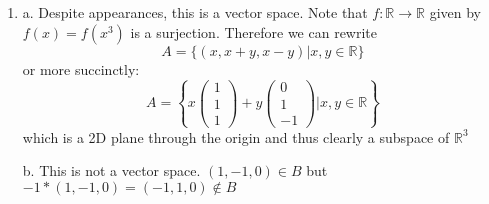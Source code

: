 \documentclass{article}
\newcommand{\chapternumber}{2}
\newenvironment{QandA}{\begin{enumerate}[label=\chapternumber.\arabic*]\bfseries\boldmath}
	{\end{enumerate}}
\newenvironment{answered}{\par\bigskip\normalfont\unboldmath}{}
\begin{document}
\begin{QandA}
\begin{answered}
			And now we reduce the third column using the third row:
			
			\[\begin{pmatrix}
				1 & 0 & 1 & 0 \\
				0 & 1 & 1 & 0 \\
				0 & 0 & -1 & 0 \\
				0 & 0 & 0 & 1 \\
			\end{pmatrix}
			\]
			
			The determinant of this upper triangular matrix is -1, so it is invertible. Since the row space is unchanged, the original matrix was also invertible.
			
			At this point I have no qualms about getting Wolfram Alpha to compute the inverse for me, since I know that it exists. Plugging constants into the lengthy formula for a 4x4 inverse is not an instructive or enjoyable exercise.
			
			Thus we find the inverse to be 
			
			\[\begin{pmatrix}
				0 & -1 & 0 & 1 \\
				-1 & 0 & 0 & 1 \\
				1 & 1 & 0 & -1 \\
				1 & 1 & 1 & -2 \\
			\end{pmatrix}\]
		\end{answered}
		
		\item 
		\begin{answered}
			a. Despite appearances, this is a vector space. Note that $f:\mathbb{R}\rightarrow\mathbb{R}$ given by $f(x)=f(x^3)$ is a surjection. Therefore we can rewrite
			\[A = \{(x,x+y,x-y)|x,y\in\mathbb{R}\}\]
			or more succinctly:
			\[A = \left\{
			x\begin{pmatrix}
				1 \\ 1 \\ 1
			\end{pmatrix}
			+			
			y\begin{pmatrix}
				0 \\ 1 \\ -1
			\end{pmatrix}
			|x,y\in\mathbb{R}
			\right\}
			\]
			which is a 2D plane through the origin and thus clearly a subspace of $\mathbb{R}^3$
			
			b. This is not a vector space. $(1,-1,0)\in B$ but $-1*(1,-1,0)=(-1,1,0)\notin B$
			

\end{answered}
\end{QandA}
\end{document}
